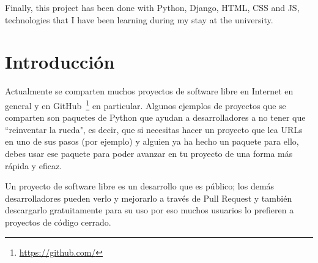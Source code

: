 \documentclass[a4paper, 12pt]{book}
\begin{document}
Finally, this project has been done with Python, Django, HTML, CSS and JS, technologies that I have been learning during my stay at the university.



\tableofcontents 
\cleardoublepage
\listoffigures %



\cleardoublepage
\chapter{Introducción}
\label{chap:introducción}
\label{sec:intro} %

Actualmente se comparten muchos proyectos de software libre en Internet en general y en GitHub~\cite{website:GitHub}\footnote{\url{https://github.com/}} en particular. Algunos ejemplos de proyectos que se comparten son paquetes de Python que
ayudan a desarrolladores a no tener que ``reinventar la rueda", es decir, que si necesitas hacer un proyecto que lea URLs en uno de sus pasos (por ejemplo) y alguien ya ha hecho un paquete para
ello, debes usar ese paquete para poder avanzar en tu proyecto de una forma más rápida y eficaz.

Un proyecto de software libre es un desarrollo que es público; los demás desarrolladores pueden verlo y mejorarlo a través de Pull Request y también descargarlo gratuitamente para su uso por eso muchos usuarios lo prefieren a proyectos de código cerrado.
\end{document}
